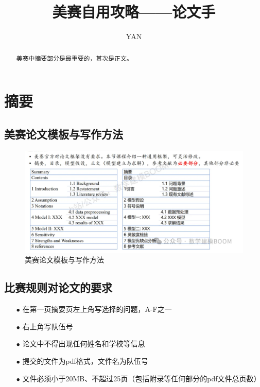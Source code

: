 \documentclass[12pt]{article}
\begin{document}
	
	\title{美赛自用攻略——论文手}
	\author{YAN}
	\maketitle
	
	\begin{abstract}
		
		美赛中摘要部分是最重要的，其次是正文。
		
	\end{abstract}
	
	\section{摘要}
		\subsection{美赛论文模板与写作方法}
			\begin{figure}[htbp]
				\centering
				\includegraphics[width=1\textwidth]{1}
				\caption{美赛论文模板与写作方法}
				\label{fig:1}
			\end{figure}
		\subsection{比赛规则对论文的要求}
			\begin{itemize}
				\item[$\bullet$] 在第一页摘要页左上角写选择的问题，A-F之一
				\item[$\bullet$] 右上角写队伍号
				\item[$\bullet$] 论文中不得出现任何姓名和学校等信息
				\item[$\bullet$] 提交的文件为pdf格式，文件名为队伍号
				\item[$\bullet$] 文件必须小于20MB、不超过25页（包括附录等任何部分的pdf文件总页数）
			\end{itemize}
\end{document}
